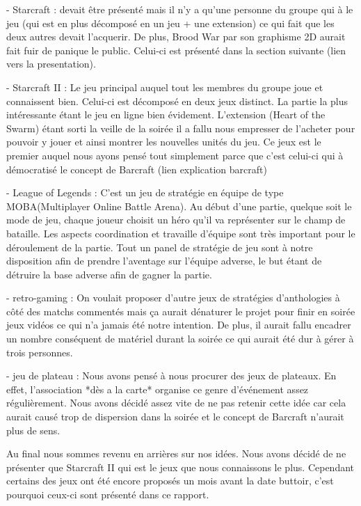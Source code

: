 - Starcraft : devait être présenté mais il n'y a qu'une personne du
groupe qui à le jeu (qui est en plus décomposé en un jeu + une
extension) ce qui fait que les deux autres devait l'acquerir. De
plus, Brood War par son graphisme 2D aurait fait fuir de panique le
public. Celui-ci est présenté dans la section suivante (lien vers la
presentation).

- Starcraft II : Le jeu principal auquel tout les membres du groupe joue
et connaissent bien. Celui-ci est décomposé en deux jeux distinct.  La
partie la plus intéressante étant le jeu en ligne bien évidement.
L'extension (Heart of the Swarm) étant sorti la veille de la soirée il a
fallu nous empresser de l'acheter pour pouvoir y jouer et ainsi montrer
les nouvelles unités du jeu. Ce jeux est le premier auquel nous ayons
pensé tout simplement parce que c'est celui-ci qui à démocratisé le
concept de Barcraft (lien explication barcraft)

- League of Legends : C'est un jeu de stratégie en équipe de type
MOBA(Multiplayer Online Battle Arena). Au début d'une partie, quelque soit
le mode de jeu, chaque joueur choisit un héro qu'il va représenter sur 
le champ de bataille. Les aspects coordination et travaille d'équipe sont très
important pour le déroulement de la partie. Tout un panel de stratégie de jeu
sont à notre disposition afin de prendre l'aventage sur l'équipe adverse, le 
but étant de détruire la base adverse afin de gagner la partie.

- retro-gaming : On voulait proposer d'autre jeux de stratégies
d'anthologies à côté des matchs commentés mais ça aurait dénaturer le
projet pour finir en soirée jeux vidéos ce qui n'a jamais été notre
intention. De plus, il aurait fallu encadrer un nombre conséquent de
matériel durant la soirée ce qui aurait été dur à gérer à trois
personnes.

- jeu de plateau : Nous avons pensé à nous procurer des jeux de
plateaux. En effet, l'association *dès a la carte* organise ce genre
d'événement assez régulièrement. Nous avons décidé assez vite de ne pas
retenir cette idée car cela aurait causé trop de dispersion dans la
soirée et le concept de Barcraft n'aurait plus de sens.

Au final nous sommes revenu en arrières sur nos idées. Nous avons décidé
de ne présenter que Starcraft II qui est le jeux que nous connaissons le
plus. Cependant certains des jeux ont été encore proposés un mois avant
la date buttoir, c'est pourquoi ceux-ci sont présenté dans ce rapport.


